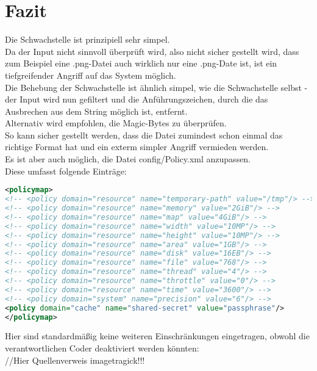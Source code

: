 \chapter{Fazit}\label{ch:fazit}

Die Schwachstelle ist prinzipiell sehr simpel.\\
Da der Input nicht sinnvoll überprüft wird, also nicht sicher gestellt wird, dass zum Beispiel eine .png-Datei auch wirklich nur eine .png-Date ist, ist ein tiefgreifender Angriff auf das System möglich.\\

Die Behebung der Schwachstelle ist ähnlich simpel, wie die Schwachstelle selbst - der Input wird nun gefiltert und die Anführungszeichen, durch die das Ausbrechen aus dem String möglich ist, entfernt.\\

Alternativ wird empfohlen, die Magic-Bytes zu überprüfen.\\
So kann sicher gestellt werden, dass die Datei zumindest schon einmal das richtige Format hat und ein exterm simpler Angriff vermieden werden.\\

Es ist aber auch möglich, die Datei config/Policy.xml anzupassen.\\
Diese umfasst folgende Einträge:\\

\begin{lstlisting}[firstnumber=47, language=XML, caption=config/Policy.xml Inhalt,label={lst:lstlisting}]
<policymap>
<!-- <policy domain="resource" name="temporary-path" value="/tmp"/> -->
<!-- <policy domain="resource" name="memory" value="2GiB"/> -->
<!-- <policy domain="resource" name="map" value="4GiB"/> -->
<!-- <policy domain="resource" name="width" value="10MP"/> -->
<!-- <policy domain="resource" name="height" value="10MP"/> -->
<!-- <policy domain="resource" name="area" value="1GB"/> -->
<!-- <policy domain="resource" name="disk" value="16EB"/> -->
<!-- <policy domain="resource" name="file" value="768"/> -->
<!-- <policy domain="resource" name="thread" value="4"/> -->
<!-- <policy domain="resource" name="throttle" value="0"/> -->
<!-- <policy domain="resource" name="time" value="3600"/> -->
<!-- <policy domain="system" name="precision" value="6"/> -->
<policy domain="cache" name="shared-secret" value="passphrase"/>
</policymap>
\end{lstlisting}
\vspace{5mm}

Hier sind standardmäßig keine weiteren Einschränkungen eingetragen, obwohl die verantwortlichen Coder deaktiviert werden könnten:\\
//Hier Quellenverweis imagetragick!!!

